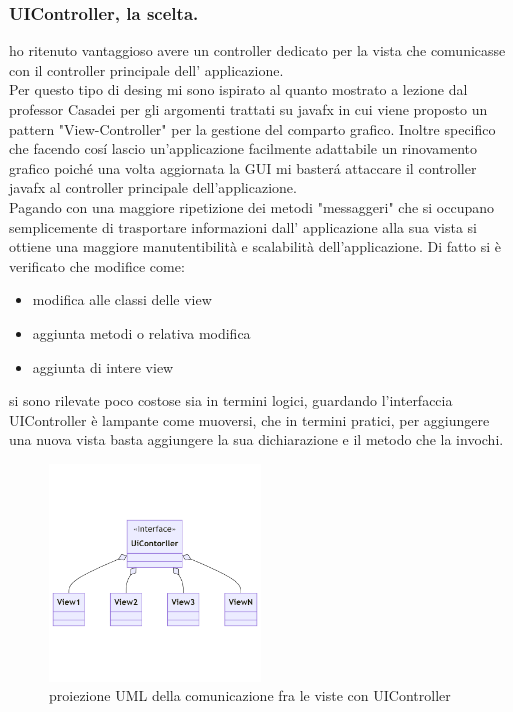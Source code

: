 \documentclass[a4paper,12pt]{report}
\begin{document}
\subsubsection{UIController, la scelta.}
ho ritenuto vantaggioso avere un controller dedicato per la vista  che comunicasse
con il controller principale dell' applicazione.
\\Per questo tipo di desing mi sono ispirato al quanto mostrato a lezione dal professor Casadei per gli argomenti trattati su
javafx in cui viene proposto un pattern "View-Controller" per la gestione del comparto grafico.
Inoltre specifico che facendo cosí lascio un'applicazione facilmente adattabile un rinovamento grafico poiché una volta aggiornata la GUI
mi basterá attaccare il controller javafx al controller principale dell'applicazione.\\
Pagando con una maggiore ripetizione dei metodi "messaggeri" che si occupano semplicemente di trasportare informazioni
dall' applicazione alla sua vista si ottiene una maggiore manutentibilità e scalabilità dell'applicazione.
Di fatto si è verificato che modifice come:
\begin{itemize}
    \item modifica alle classi delle view
    \item aggiunta metodi o relativa modifica
    \item aggiunta di intere view
\end{itemize}
si sono rilevate poco costose sia in termini logici, guardando l'interfaccia UIController è lampante come muoversi,
che in termini pratici, per aggiungere una nuova vista basta aggiungere la sua dichiarazione e il metodo che la invochi.
\begin{figure}[H]
    \centering
    \includegraphics[width=0.5\textwidth]{images/UIControllerDesing.png}
    \caption{proiezione UML della comunicazione fra le viste con UIController}
\end{figure}
\end{document}
